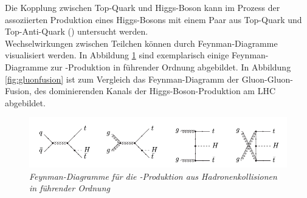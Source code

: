 Die Kopplung zwischen Top-Quark und Higgs-Boson kann im Prozess der assoziierten Produktion eines Higgs-Bosons mit einem Paar aus Top-Quark und Top-Anti-Quark (\ttH) untersucht werden.\\
Wechselwirkungen zwischen Teilchen k\"onnen durch Feynman-Diagramme visualisiert werden. In Abbildung \ref{fig:ttH_feynmans} sind exemplarisch einige Feynman-Diagramme zur \ttH-Produktion in f\"uhrender Ordnung abgebildet.%
In Abbildung \ref{fig:gluonfusion} ist zum Vergleich das Feynman-Diagramm der Gluon-Gluon-Fusion, des dominierenden Kanals der Higgs-Boson-Produktion am LHC abgebildet.


 \begin{figure}[hhh]
  \begin{center}
    \includegraphics[width=\textwidth]{graphics/ttH_feynmans.png}
    \parbox[b]{12cm}{
      \caption[\ttH Feynman-Diagramme]
             {\label{fig:ttH_feynmans} \it\!Feynman-Diagramme f\"ur die \ttH-Produktion aus Hadronenkollisionen in f\"uhrender Ordnung \cite{hep-ph/0211352}}
   }
 \end{center}
\end{figure}


